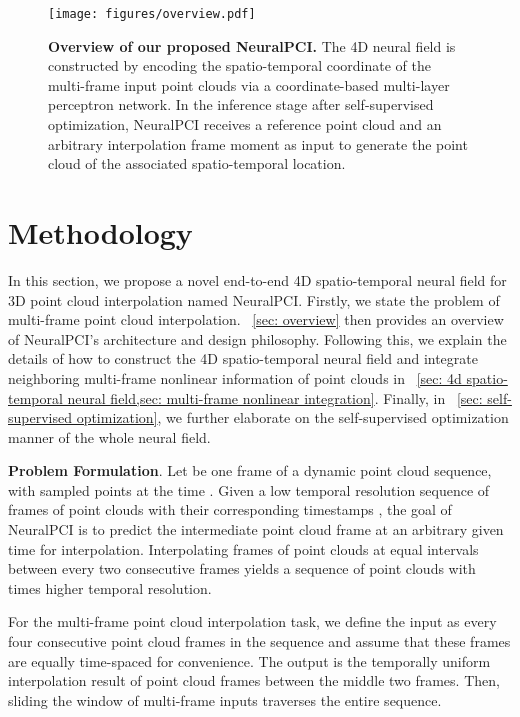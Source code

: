 \documentclass[10pt,twocolumn,letterpaper]{article}
\begin{document}
\begin{figure*}[ht]
\centering
  \texttt{[image: figures/overview.pdf]}
  \caption{\textbf{Overview of our proposed NeuralPCI.} The 4D neural field is constructed by encoding the spatio-temporal coordinate of the multi-frame input point clouds via a coordinate-based multi-layer perceptron network. In the inference stage after self-supervised optimization, NeuralPCI receives a reference point cloud and an arbitrary interpolation frame moment as input to generate the point cloud of the associated spatio-temporal location.}
  \label{fig:overview}
\vspace{-.4cm}
\end{figure*}  



\section{Methodology}
\label{sec: method}


In this section, we propose a novel end-to-end 4D spatio-temporal neural field for 3D point cloud interpolation named NeuralPCI. Firstly, we state the problem of multi-frame point cloud interpolation. ~\cref{sec: overview} then provides an overview of NeuralPCI's architecture and design philosophy. Following this, we explain the details of how to construct the 4D spatio-temporal neural field and integrate neighboring multi-frame nonlinear information of point clouds in ~\cref{sec: 4d spatio-temporal neural field,sec: multi-frame nonlinear integration}. Finally, in ~\cref{sec: self-supervised optimization}, we further elaborate on the self-supervised optimization manner of the whole neural field.

\textbf{Problem Formulation}.   
Let  be one frame of a dynamic point cloud sequence, with  sampled points at the time . Given a low temporal resolution sequence of  frames of point clouds  with their corresponding timestamps , the goal of NeuralPCI is to predict the intermediate point cloud frame  at an arbitrary given time  for interpolation. Interpolating  frames of point clouds at equal intervals between every two consecutive frames yields a sequence of point clouds with  times higher temporal resolution.
  
For the multi-frame point cloud interpolation task, we define the input as every four consecutive point cloud frames in the sequence  and assume that these frames are equally time-spaced for convenience. The output is the temporally uniform interpolation result of  point cloud frames between the middle two frames. Then, sliding the window of multi-frame inputs traverses the entire sequence.
\end{document}
